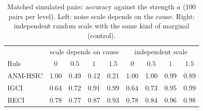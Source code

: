 \begin{table}[ht]
\caption{Matched simulated pairs: accuracy against the strength $a$ ($100$ pairs per level). Left: noise scale depends on the cause. Right: independent random scale with the same kind of marginal (control).}
\label{tab:dose}
\small
\begin{tabular}{@{}lcccc|cccc@{}}
\toprule
 & \multicolumn{4}{c|}{scale depends on cause} & \multicolumn{4}{c}{independent scale}\\
Rule & $0$ & $0.5$ & $1$ & $1.5$ & $0$ & $0.5$ & $1$ & $1.5$\\
\midrule
ANM-HSIC & 1.00 & 0.49 & 0.12 & 0.21 & 1.00 & 1.00 & 0.99 & 0.89\\
IGCI & 0.64 & 0.72 & 0.91 & 0.99 & 0.64 & 0.73 & 0.95 & 0.99\\
RECI & 0.78 & 0.77 & 0.87 & 0.93 & 0.78 & 0.84 & 0.96 & 0.98\\
\bottomrule
\end{tabular}
\end{table}
